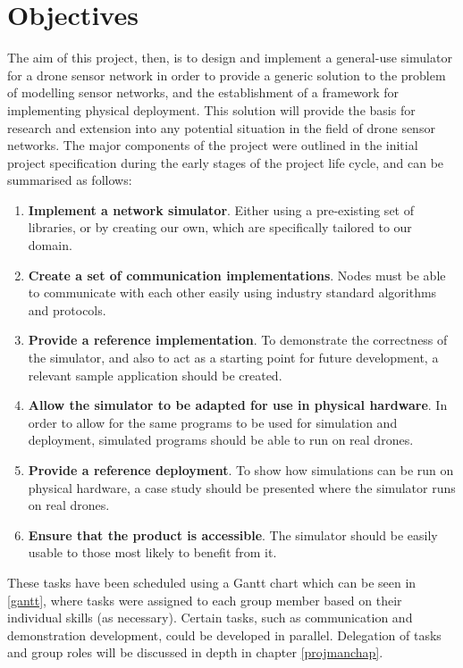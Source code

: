 \section{Objectives}
\label{sec:obj}
The aim of this project, then, is to design and implement a general-use simulator for a drone sensor network in order to provide a generic solution to the problem of modelling sensor networks, and the establishment of a framework for implementing physical deployment. This solution will provide the basis for research and extension into any potential situation in the field of drone sensor networks. The major components of the project were outlined in the initial project specification during the early stages of the project life cycle, and can be summarised as follows: 
\begin{enumerate}
  \item \textbf{Implement a network simulator}. Either using a pre-existing set of libraries, or by creating our own, which are specifically tailored to our domain.
  \item \textbf{Create a set of communication implementations}. Nodes must be able to communicate with each other easily using industry standard algorithms and protocols.
  \item \textbf{Provide a reference implementation}. To demonstrate the correctness of the simulator, and also to act as a starting point for future development, a relevant sample application should be created.
\item \textbf{Allow the simulator to be adapted for use in physical hardware}. In order to allow for the same programs to be used for simulation and deployment, simulated programs should be able to run on real drones. 
\item \textbf{Provide a reference deployment}. To show how simulations can be run on physical hardware, a case study should be presented where the simulator runs on real drones.
\item \textbf{Ensure that the product is accessible}. The simulator should be easily usable to those most likely to benefit from it.
\end{enumerate}
These tasks have been scheduled using a Gantt chart which can be seen in \ref{gantt}, where tasks were assigned to each group member based on their individual skills (as necessary). Certain tasks, such as communication and demonstration development, could be developed in parallel. Delegation of tasks and group roles will be discussed in depth in chapter \ref{projmanchap}.

